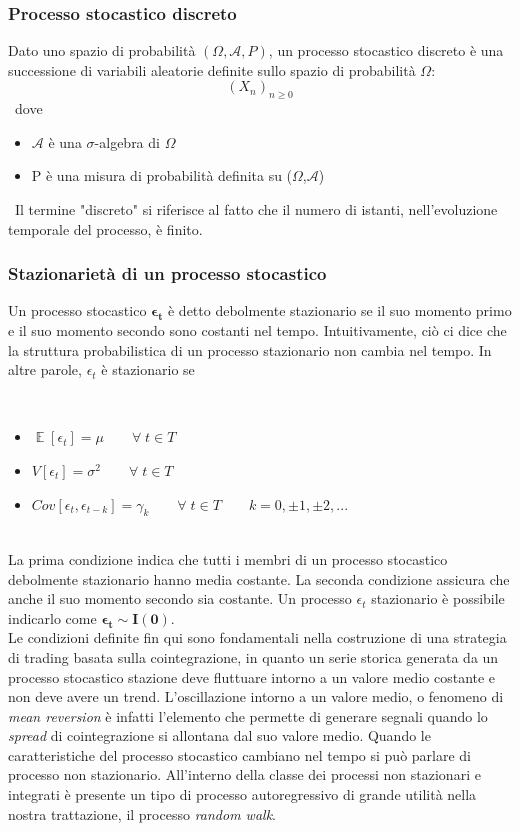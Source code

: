 \documentclass[]{article}
\DeclareMathOperator{\E}{\mathbb{E}}
\begin{document}
\subsubsection*{Processo stocastico discreto}
Dato uno spazio di probabilità $(\Omega,\mathcal{A},P)$, un processo stocastico discreto è una successione di variabili aleatorie definite sullo spazio di probabilità $\Omega$:
\begin{equation}
	(X_n)_{n \ge0}
\end{equation}
\
dove 
\begin{itemize}
	\item $\mathcal{A}$ è una $\sigma$-algebra di $\Omega$
	\item P è una misura di probabilità definita su ($\Omega$,$\mathcal{A}$)
\end{itemize}
\
Il termine "discreto" si riferisce al fatto che il numero di istanti, nell'evoluzione temporale del processo, è finito.
\subsubsection*{Stazionarietà di un processo stocastico}

Un processo stocastico $\mathbf{\epsilon_t}$ è detto debolmente stazionario se il suo momento primo e il suo momento secondo sono costanti nel tempo. Intuitivamente, ciò ci dice che la struttura probabilistica di un processo stazionario non cambia nel tempo.
In altre parole, $\epsilon_t$ è stazionario se 

\
\begin{itemize}
	\item $\E[\epsilon_t]= \mu \qquad \forall \; t \in T $ 
	\item $V[\epsilon_t] = \sigma^2 \qquad \forall \; t \in T$ 
	\item $Cov[\epsilon_t,\epsilon_{t-k}]=\gamma_k \qquad \forall \; t \in T \qquad k=  0, \pm 1, \pm 2, ...$
\end{itemize}
\
\\
La prima condizione indica che tutti i membri di un processo stocastico debolmente stazionario hanno media costante. La seconda condizione assicura che anche il suo momento secondo sia costante.
Un processo $\epsilon_t$ stazionario è possibile indicarlo come $\mathbf{\epsilon_t \sim I(0)}$.
\\
Le condizioni definite fin qui sono fondamentali nella costruzione di una strategia di trading basata sulla cointegrazione, in quanto un serie storica generata da un processo stocastico stazione deve fluttuare intorno a un valore medio costante e non deve avere un trend.
L'oscillazione intorno a un valore medio, o fenomeno di \textit{mean reversion} è  infatti l'elemento che permette di generare segnali quando lo \textit{spread} di cointegrazione si allontana dal suo valore medio.
Quando le caratteristiche del processo stocastico cambiano nel tempo si può parlare di processo non stazionario. All’interno della classe dei processi non stazionari e integrati è presente un tipo di processo autoregressivo di grande utilità nella nostra trattazione, il processo \textit{random walk}.
\end{document}
